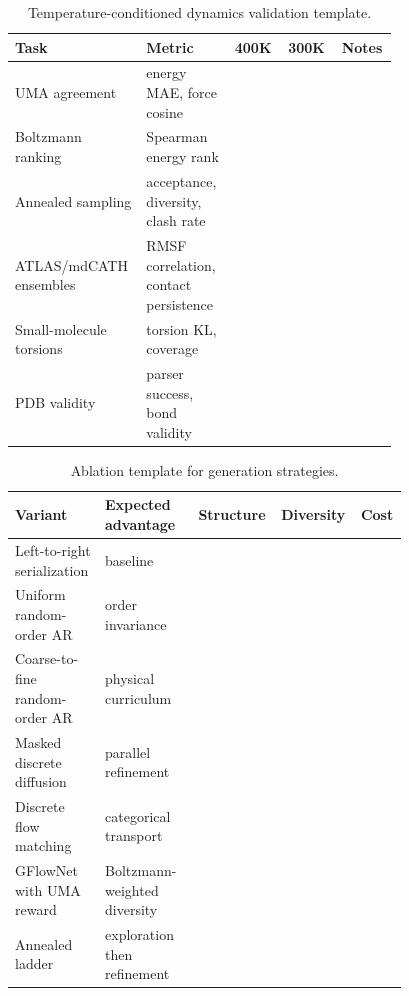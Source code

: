 \documentclass[11pt]{article}
\newcommand{\1}{\mathbf{1}}
\begin{document}
\begin{table}[H]
\centering
\caption{Temperature-conditioned dynamics validation template.}
\scriptsize
\setlength{\tabcolsep}{3pt}
\begin{tabular}{p{0.21\linewidth}p{0.21\linewidth}p{0.13\linewidth}p{0.13\linewidth}p{0.08\linewidth}}
\toprule
Task & Metric & 400K & 300K & Notes \\
\midrule
UMA agreement & energy MAE, force cosine & & & \\
Boltzmann ranking & Spearman energy rank & & & \\
Annealed sampling & acceptance, diversity, clash rate & & & \\
ATLAS/mdCATH ensembles & RMSF correlation, contact persistence & & & \\
Small-molecule torsions & torsion KL, coverage & & & \\
PDB validity & parser success, bond validity & & & \\
\bottomrule
\end{tabular}
\end{table}

\begin{table}[H]
\centering
\caption{Ablation template for generation strategies.}
\scriptsize
\setlength{\tabcolsep}{3pt}
\begin{tabular}{p{0.22\linewidth}p{0.23\linewidth}p{0.13\linewidth}p{0.13\linewidth}p{0.07\linewidth}}
\toprule
Variant & Expected advantage & Structure & Diversity & Cost \\
\midrule
Left-to-right serialization & baseline & & & \\
Uniform random-order AR & order invariance & & & \\
Coarse-to-fine random-order AR & physical curriculum & & & \\
Masked discrete diffusion & parallel refinement & & & \\
Discrete flow matching & categorical transport & & & \\
GFlowNet with UMA reward & Boltzmann-weighted diversity & & & \\
Annealed ladder & exploration then refinement & & & \\
\bottomrule
\end{tabular}
\end{table}
\end{document}
